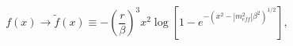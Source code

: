 \begin{equation}
f\left(x\right)\rightarrow \widetilde{f}\left(x\right)\equiv -\left(\frac{r}{\beta }\right)^{3}x^{2}\log \left[1-e^{-\left(x^{2}-\left|m_{eff}^{2}\right|\beta ^{2}\right)^{1/2}}\right],\end{equation}

